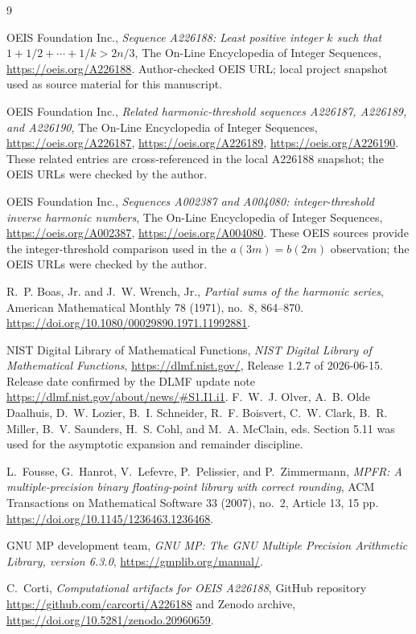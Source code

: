 \documentclass[11pt]{article}
\theoremstyle{definition}
\theoremstyle{remark}
\begin{document}
\begin{thebibliography}{9}
\sloppy
\raggedright

OEIS Foundation Inc.,
\emph{Sequence A226188: Least positive integer \(k\) such that
\(1+1/2+\cdots+1/k>2n/3\)},
The On-Line Encyclopedia of Integer Sequences,
\url{https://oeis.org/A226188}.
Author-checked OEIS URL; local project snapshot used as source material for
this manuscript.

OEIS Foundation Inc.,
\emph{Related harmonic-threshold sequences A226187, A226189, and A226190},
The On-Line Encyclopedia of Integer Sequences,
\url{https://oeis.org/A226187},
\url{https://oeis.org/A226189},
\url{https://oeis.org/A226190}.
These related entries are cross-referenced in the local A226188 snapshot; the
OEIS URLs were checked by the author.

OEIS Foundation Inc.,
\emph{Sequences A002387 and A004080: integer-threshold inverse harmonic
numbers},
The On-Line Encyclopedia of Integer Sequences,
\url{https://oeis.org/A002387},
\url{https://oeis.org/A004080}.
These OEIS sources provide the integer-threshold comparison used in the
\(a(3m)=b(2m)\) observation; the OEIS URLs were checked by the author.

R.~P. Boas, Jr. and J.~W. Wrench, Jr.,
\emph{Partial sums of the harmonic series},
American Mathematical Monthly 78 (1971), no.~8, 864--870.
\url{https://doi.org/10.1080/00029890.1971.11992881}.

NIST Digital Library of Mathematical Functions,
\emph{NIST Digital Library of Mathematical Functions},
\url{https://dlmf.nist.gov/}, Release 1.2.7 of 2026-06-15.
Release date confirmed by the DLMF update note
\url{https://dlmf.nist.gov/about/news/#S1.I1.i1}.
F.~W.~J. Olver, A.~B. Olde Daalhuis, D.~W. Lozier, B.~I. Schneider,
R.~F. Boisvert, C.~W. Clark, B.~R. Miller, B.~V. Saunders, H.~S. Cohl,
and M.~A. McClain, eds.
Section 5.11 was used for the asymptotic expansion and remainder discipline.

L.~Fousse, G.~Hanrot, V.~Lefevre, P.~Pelissier, and P.~Zimmermann,
\emph{MPFR: A multiple-precision binary floating-point library with correct
rounding},
ACM Transactions on Mathematical Software 33 (2007), no.~2, Article 13,
15 pp. \url{https://doi.org/10.1145/1236463.1236468}.

GNU MP development team,
\emph{GNU MP: The GNU Multiple Precision Arithmetic Library, version 6.3.0},
\url{https://gmplib.org/manual/}.

C.~Corti,
\emph{Computational artifacts for OEIS A226188},
GitHub repository \url{https://github.com/carcorti/A226188} and Zenodo archive,
\url{https://doi.org/10.5281/zenodo.20960659}.

\end{thebibliography}
\end{document}
